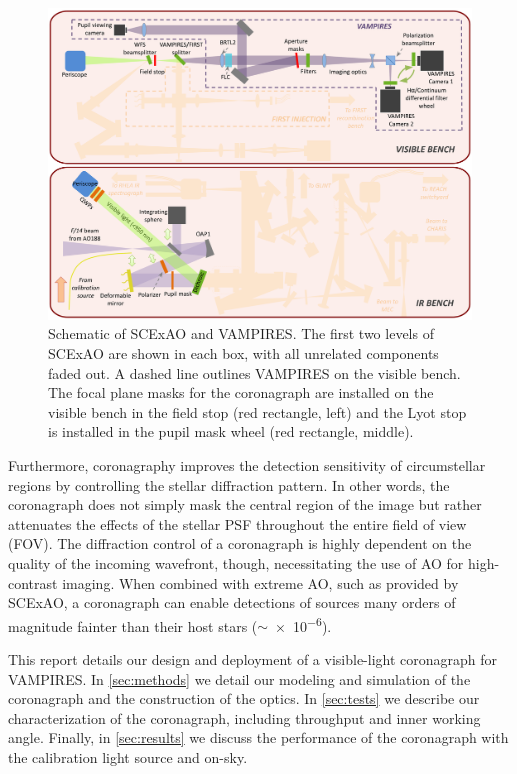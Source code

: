 \documentclass[]{spie}  %
\begin{document}
\begin{figure}
   \centering
   \includegraphics[width=\textwidth]{figures/VAMPIRES_bench}
   \caption{Schematic of SCExAO and VAMPIRES. The first two levels of SCExAO are shown in each box, with all unrelated components faded out. A dashed line outlines VAMPIRES on the visible bench. The focal plane masks for the coronagraph are installed on the visible bench in the field stop (red rectangle, left) and the Lyot stop is installed in the pupil mask wheel (red rectangle, middle).}\label{fig:bench}
\end{figure}

Furthermore, coronagraphy improves the detection sensitivity of circumstellar regions by controlling the stellar diffraction pattern. In other words, the coronagraph does not simply mask the central region of the image but rather attenuates the effects of the stellar PSF throughout the entire field of view (FOV). The diffraction control of a coronagraph is highly dependent on the quality of the incoming wavefront, though, necessitating the use of AO for high-contrast imaging. When combined with extreme AO, such as provided by SCExAO, a coronagraph can enable detections of sources many orders of magnitude fainter than their host stars ($\sim$\num{e-6})\cite{guyon2018}.

This report details our design and deployment of a visible-light coronagraph for VAMPIRES. In \autoref{sec:methods} we detail our modeling and simulation of the coronagraph and the construction of the optics. In \autoref{sec:tests} we describe our characterization of the coronagraph, including throughput and inner working angle. Finally, in \autoref{sec:results} we discuss the performance of the coronagraph with the calibration light source and on-sky.
\end{document}
